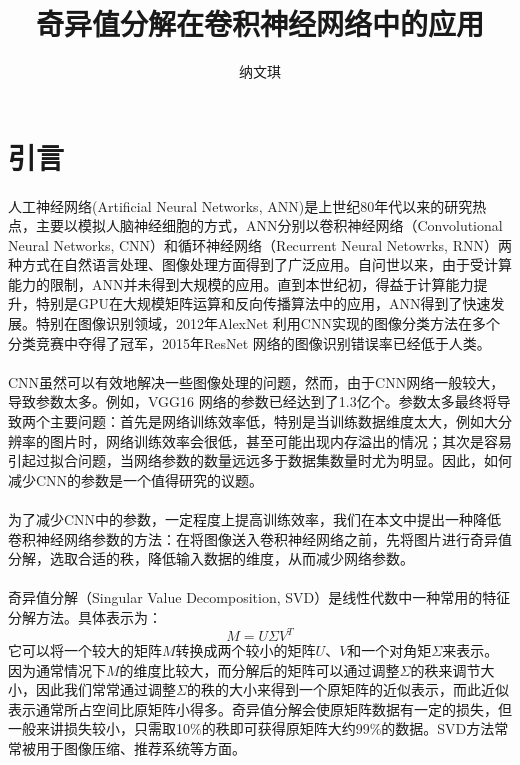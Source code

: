 \documentclass[12pt,a4paper]{article}
\begin{document}

\title{奇异值分解在卷积神经网络中的应用}
\author[*]{纳文琪}
\date{}
\maketitle


\section{引言}
\paragraph{} 人工神经网络(Artificial Neural Networks, ANN)是上世纪80年代以来的研究热点，主要以模拟人脑神经细胞的方式，ANN分别以卷积神经网络（Convolutional Neural Networks, CNN）和循环神经网络（Recurrent Neural Netowrks, RNN）两种方式在自然语言处理、图像处理方面得到了广泛应用。自问世以来，由于受计算能力的限制，ANN并未得到大规模的应用。直到本世纪初，得益于计算能力提升，特别是GPU在大规模矩阵运算和反向传播算法中的应用，ANN得到了快速发展。特别在图像识别领域，2012年AlexNet\cite{alexnet} 利用CNN实现的图像分类方法在多个分类竞赛中夺得了冠军，2015年ResNet\cite{resnet} 网络的图像识别错误率已经低于人类。
\paragraph{} CNN虽然可以有效地解决一些图像处理的问题，然而，由于CNN网络一般较大，导致参数太多。例如，VGG16\cite{vgg} 网络的参数已经达到了1.3亿个。参数太多最终将导致两个主要问题：首先是网络训练效率低，特别是当训练数据维度太大，例如大分辨率的图片时，网络训练效率会很低，甚至可能出现内存溢出的情况；其次是容易引起过拟合问题，当网络参数的数量远远多于数据集数量时尤为明显。因此，如何减少CNN的参数是一个值得研究的议题。
\paragraph{} 为了减少CNN中的参数，一定程度上提高训练效率，我们在本文中提出一种降低卷积神经网络参数的方法：在将图像送入卷积神经网络之前，先将图片进行奇异值分解，选取合适的秩，降低输入数据的维度，从而减少网络参数。
\paragraph{} 奇异值分解（Singular Value Decomposition, SVD）是线性代数中一种常用的特征分解方法。具体表示为：
\begin{equation}
	M=U\Sigma V^T
\end{equation}
它可以将一个较大的矩阵$M$转换成两个较小的矩阵$U$、$V$和一个对角矩$\Sigma$来表示。因为通常情况下$M$的维度比较大，而分解后的矩阵可以通过调整$\Sigma$的秩来调节大小，因此我们常常通过调整$\Sigma$的秩的大小来得到一个原矩阵的近似表示，而此近似表示通常所占空间比原矩阵小得多。奇异值分解会使原矩阵数据有一定的损失，但一般来讲损失较小，只需取10\%的秩即可获得原矩阵大约99\%的数据。SVD方法常常被用于图像压缩、推荐系统等方面。
\end{document}
